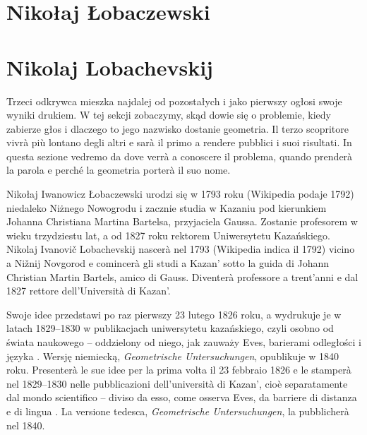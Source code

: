 
\section{Nikołaj Łobaczewski} %
\section{Nikolaj Lobachevskij} %
\label{sekcja_lobaczewski}

Trzeci odkrywca mieszka najdalej od pozostałych i jako pierwszy ogłosi swoje wyniki drukiem. %
W tej sekcji zobaczymy, skąd dowie się o problemie, kiedy zabierze głos i dlaczego to jego nazwisko dostanie geometria. %
Il terzo scopritore vivrà più lontano degli altri e sarà il primo a rendere pubblici i suoi risultati. %
In questa sezione vedremo da dove verrà a conoscere il problema, quando prenderà la parola e perché la geometria porterà il suo nome. %

Nikołaj Iwanowicz Łobaczewski urodzi się w 1793 roku (Wikipedia podaje 1792) niedaleko Niżnego Nowogrodu i zacznie studia w Kazaniu pod kierunkiem Johanna Christiana Martina Bartelsa, przyjaciela Gaussa. %
Zostanie profesorem w wieku trzydziestu lat, a od 1827 roku rektorem Uniwersytetu Kazańskiego. %
Nikolaj Ivanovič Lobachevskij nascerà nel 1793 (Wikipedia indica il 1792) vicino a Nižnij Novgorod e comincerà gli studi a Kazan' sotto la guida di Johann Christian Martin Bartels, amico di Gauss. %
Diventerà professore a trent'anni e dal 1827 rettore dell'Università di Kazan'. %
%

Swoje idee przedstawi po raz pierwszy 23 lutego 1826 roku, a wydrukuje je w latach 1829--1830 w publikacjach uniwersytetu kazańskiego, czyli osobno od świata naukowego -- oddzielony od niego, jak zauważy Eves, barierami odległości i języka \cite[s. 287]{eves1_1972}. %
Wersję niemiecką, \emph{Geometrische Untersuchungen}, opublikuje w 1840 roku. %
Presenterà le sue idee per la prima volta il 23 febbraio 1826 e le stamperà nel 1829--1830 nelle pubblicazioni dell'università di Kazan', cioè separatamente dal mondo scientifico -- diviso da esso, come osserva Eves, da barriere di distanza e di lingua \cite[p. 287]{eves1_1972}. %
La versione tedesca, \emph{Geometrische Untersuchungen}, la pubblicherà nel 1840. %

